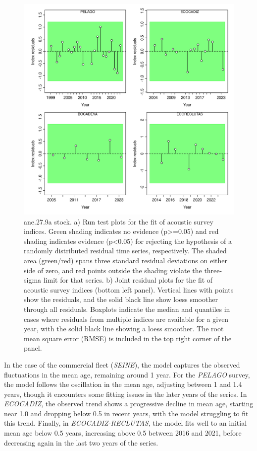 \documentclass[
]{article}
\begin{document}
\begin{figure}[H]

{\centering \includegraphics[width=0.95\linewidth]{report/run/S1.0_4FLEETS/fig_runtest_residuals_indices} 

}

\caption{ane.27.9a stock. a) Run test plots for the fit of acoustic survey indices. Green shading indicates no evidence (p>=0.05) and red shading indicates evidence (p<0.05) for rejecting the hypothesis of a randomly distributed residual time series, respectively. The shaded area (green/red) spans three standard residual deviations on either side of zero, and red points outside the shading violate the three-sigma limit for that series. b) Joint residual plots for the fit of acoustic survey indices (bottom left panel).  Vertical lines with points show the residuals, and the solid black line show loess smoother through all residuals. Boxplots indicate the median and quantiles in cases where residuals from multiple indices are available for a given year, with the solid black line showing a loess smoother. The root mean square error (RMSE) is included in the top right corner of the panel.}\label{fig:unnamed-chunk-15}
\end{figure}

In the case of the commercial fleet (\emph{SEINE}), the model captures
the observed fluctuations in the mean age, remaining around 1 year. For
the \emph{PELAGO} survey, the model follows the oscillation in the mean
age, adjusting between 1 and 1.4 years, though it encounters some
fitting issues in the later years of the series. In \emph{ECOCADIZ}, the
observed trend shows a progressive decline in mean age, starting near
1.0 and dropping below 0.5 in recent years, with the model struggling to
fit this trend. Finally, in \emph{ECOCADIZ-RECLUTAS}, the model fits
well to an initial mean age below 0.5 years, increasing above 0.5
between 2016 and 2021, before decreasing again in the last two years of
the series.
\end{document}
